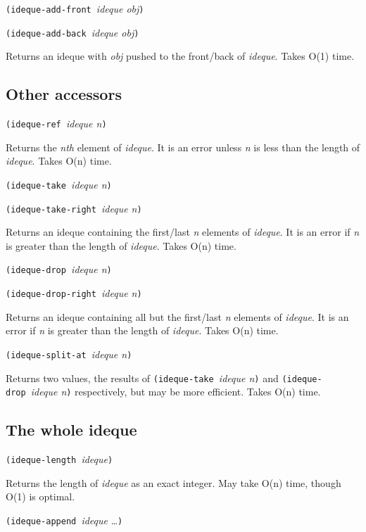 \texttt{(ideque-add-front\ }\emph{ideque obj}\texttt{)}

\texttt{(ideque-add-back\ }\emph{ideque obj}\texttt{)}

Returns an ideque with \emph{obj} pushed to the front/back of
\emph{ideque}. Takes O(1) time.

\hypertarget{Otheraccessors}{\subsection{Other
accessors}\label{Otheraccessors}}

\texttt{(ideque-ref\ }\emph{ideque n}\texttt{)}

Returns the \emph{nth} element of \emph{ideque}. It is an error unless
\emph{n} is less than the length of \emph{ideque}. Takes O(n) time.

\texttt{(ideque-take\ }\emph{ideque n}\texttt{)}

\texttt{(ideque-take-right\ }\emph{ideque n}\texttt{)}

Returns an ideque containing the first/last \emph{n} elements of
\emph{ideque}. It is an error if \emph{n} is greater than the length of
\emph{ideque}. Takes O(n) time.

\texttt{(ideque-drop\ }\emph{ideque n}\texttt{)}

\texttt{(ideque-drop-right\ }\emph{ideque n}\texttt{)}

Returns an ideque containing all but the first/last \emph{n} elements of
\emph{ideque}. It is an error if \emph{n} is greater than the length of
\emph{ideque}. Takes O(n) time.

\texttt{(ideque-split-at\ }\emph{ideque n}\texttt{)}

Returns two values, the results of \texttt{(ideque-take\ }\emph{ideque
n}\texttt{)} and \texttt{(ideque-drop\ }\emph{ideque n}\texttt{)}
respectively, but may be more efficient. Takes O(n) time.

\hypertarget{Thewholedeque}{\subsection{The whole
ideque}\label{Thewholedeque}}

\texttt{(ideque-length\ }\emph{ideque}\texttt{)}

Returns the length of \emph{ideque} as an exact integer. May take O(n)
time, though O(1) is optimal.

\texttt{(ideque-append\ }\emph{ideque} \ldots{}\texttt{)}

